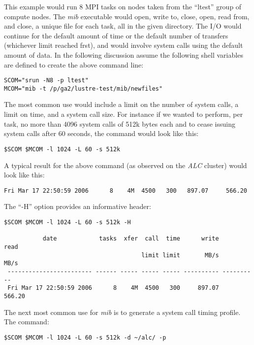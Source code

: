 \documentclass{article}
\begin{document}
This example would run 8 MPI tasks on nodes taken from the ``ltest''
group of compute nodes.  The {\em mib} executable would open, write
to, close, open, read from, and close, a unique file for each task,
all in the given directory.  The I/O would continue for the default
amount of time or the default number of transfers (whichever limit
reached frst), and would involve system calls using the default amount
of data.  In the following discussion assume the following shell
variables are defined to create the above command line:

\begin{verbatim}
SCOM="srun -N8 -p ltest"
MCOM="mib -t /p/ga2/lustre-test/mib/newfiles"
\end{verbatim}

The most common use would include a limit on the number of system
calls, a limit on time, and a system call size.  For instance if we
wanted to perform, per task, no more than 4096 system calls of 512k
bytes each and to cease issuing system calls after 60 seconds, the
command would look like this:

\begin{verbatim}
$SCOM $MCOM -l 1024 -L 60 -s 512k
\end{verbatim}

A typical result for the above command (as observed on the {\em ALC}
cluster) would look like this:


\begin{verbatim}
Fri Mar 17 22:50:59 2006      8    4M  4500   300	897.07     566.20
\end{verbatim}

The ``-H'' option provides an informative header:

\begin{verbatim}
$SCOM $MCOM -l 1024 -L 60 -s 512k -H

           date            tasks  xfer  call  time      write       read
                                       limit limit       MB/s       MB/s
 ------------------------ ------ ----- ----- ----- ---------- ----------
 Fri Mar 17 22:50:59 2006      8    4M  4500   300     897.07      566.20
\end{verbatim}

The next most common use for {\em mib} is to generate a system call timing
profile.  The command:

\begin{verbatim}
$SCOM $MCOM -l 1024 -L 60 -s 512k -d ~/alc/ -p
\end{verbatim}
\end{document}
